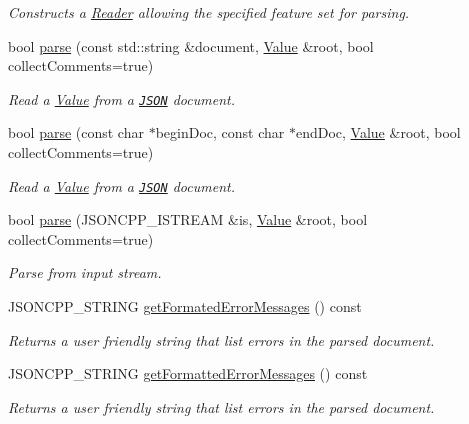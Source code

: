 \begin{DoxyCompactItemize}
\begin{DoxyCompactList}\small\item\em Constructs a \hyperlink{classJson_1_1Reader}{Reader} allowing the specified feature set for parsing. \end{DoxyCompactList}\item 
bool \hyperlink{classJson_1_1Reader_af1da6c976ad1e96c742804c3853eef94}{parse} (const std\+::string \&document, \hyperlink{classJson_1_1Value}{Value} \&root, bool collect\+Comments=true)
\begin{DoxyCompactList}\small\item\em Read a \hyperlink{classJson_1_1Value}{Value} from a \href{http://www.json.org}{\tt J\+S\+ON} document. \end{DoxyCompactList}\item 
bool \hyperlink{classJson_1_1Reader_ac71ef2b64c7c27b062052e692af3fb32}{parse} (const char $\ast$begin\+Doc, const char $\ast$end\+Doc, \hyperlink{classJson_1_1Value}{Value} \&root, bool collect\+Comments=true)
\begin{DoxyCompactList}\small\item\em Read a \hyperlink{classJson_1_1Value}{Value} from a \href{http://www.json.org}{\tt J\+S\+ON} document. \end{DoxyCompactList}\item 
bool \hyperlink{classJson_1_1Reader_a6d5d0e23f68749d2f17feece4ccf504d}{parse} (J\+S\+O\+N\+C\+P\+P\+\_\+\+I\+S\+T\+R\+E\+AM \&is, \hyperlink{classJson_1_1Value}{Value} \&root, bool collect\+Comments=true)
\begin{DoxyCompactList}\small\item\em Parse from input stream. \end{DoxyCompactList}\item 
J\+S\+O\+N\+C\+P\+P\+\_\+\+S\+T\+R\+I\+NG \hyperlink{classJson_1_1Reader_aa5625687e318cce8eee2ed72d1f307b2}{get\+Formated\+Error\+Messages} () const 
\begin{DoxyCompactList}\small\item\em Returns a user friendly string that list errors in the parsed document. \end{DoxyCompactList}\item 
J\+S\+O\+N\+C\+P\+P\+\_\+\+S\+T\+R\+I\+NG \hyperlink{classJson_1_1Reader_ade23e7adc6aba3705618a401b7d5cea8}{get\+Formatted\+Error\+Messages} () const 
\begin{DoxyCompactList}\small\item\em Returns a user friendly string that list errors in the parsed document. \end{DoxyCompactList}\item 

\end{DoxyCompactItemize}
